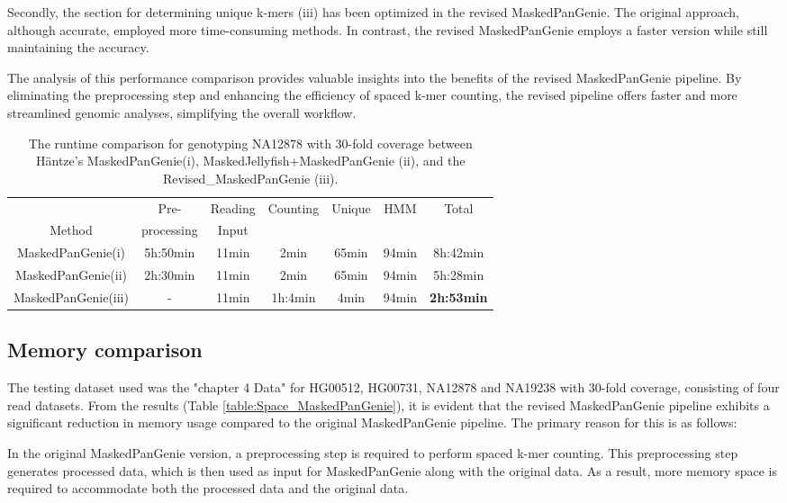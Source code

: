 \documentclass{PHlab-thesis}
\begin{document}
Secondly, the section for determining unique k-mers (iii) has been optimized in the revised MaskedPanGenie. The original approach, although accurate, employed more time-consuming methods. In contrast, the revised MaskedPanGenie employs a faster version while still maintaining the accuracy.

The analysis of this performance comparison provides valuable insights into the benefits of the revised MaskedPanGenie pipeline. By eliminating the preprocessing step and enhancing the efficiency of spaced k-mer counting, the revised pipeline offers faster and more streamlined genomic analyses, simplifying the overall workflow.
\begin{table}[ht!]
	\centering
	\begin{tabular*}{\textwidth}{@{\extracolsep{\fill}}ccccccc@{\extracolsep{\fill}}}
        \toprule
         & Pre- & Reading & Counting & Unique & HMM & Total\\
         Method & processing & Input & & & &\\
        \midrule
        MaskedPanGenie(i)& 5h:50min & 11min & 2min & 65min & 94min& 8h:42min \\
        MaskedPanGenie(ii)& 2h:30min & 11min & 2min & 65min & 94min & 5h:28min\\
        MaskedPanGenie(iii)& - & 11min & 1h:4min & 4min & 94min & \textbf{2h:53min}\\
        \bottomrule 
	\end{tabular*}
    \caption{The runtime comparison for genotyping NA12878 with 30-fold coverage between Häntze's MaskedPanGenie(i), MaskedJellyfish+MaskedPanGenie (ii), and the Revised\_MaskedPanGenie (iii).}
	\label{table:MaskedPanGenie}
\end{table}
\subsection{Memory comparison}
The testing dataset used was the "chapter 4 Data" for HG00512, HG00731, NA12878 and NA19238 with 30-fold coverage, consisting of four read datasets. From the results (Table \ref{table:Space_MaskedPanGenie}), it is evident that the revised MaskedPanGenie pipeline exhibits a significant reduction in memory usage compared to the original MaskedPanGenie pipeline. The primary reason for this is as follows:

In the original MaskedPanGenie version, a preprocessing step is required to perform spaced k-mer counting. This preprocessing step generates processed data, which is then used as input for MaskedPanGenie along with the original data. As a result, more memory space is required to accommodate both the processed data and the original data.
\end{document}
